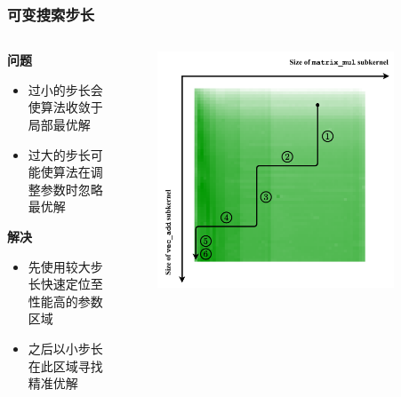 \documentclass[aspectratio=169]{ctexbeamer}
\begin{document}
\begin{frame}
  \frametitle{可变搜索步长}
  \begin{columns}
    \begin{column}{0.5\textwidth}
    \textbf{问题}
      \begin{itemize}
        \item 过小的步长会使算法收敛于局部最优解
        \item 过大的步长可能使算法在调整参数时忽略最优解
      \end{itemize}
    \textbf{解决}
      \begin{itemize}
        \item 先使用较大步长快速定位至性能高的参数区域
        \item 之后以小步长在此区域寻找精准优解
      \end{itemize}
    \end{column}
    \begin{column}{0.5\textwidth}
      \begin{figure}
        \includegraphics[width=0.9\textwidth]{figures/searching_trace_va_mm.drawio.pdf}
      \end{figure}
    \end{column}
  \end{columns}
\end{frame}
\end{document}
